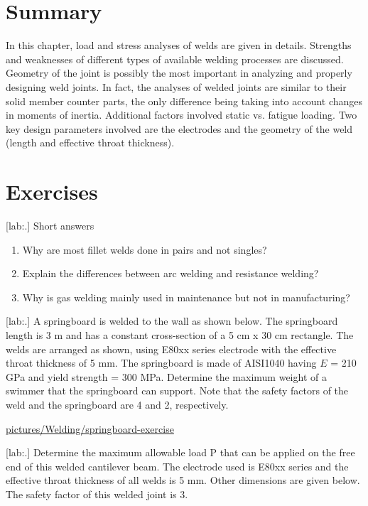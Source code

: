 \documentclass[a4paper,openany,12pt]{book}
\begin{document}
{{\section{Summary}
\label{summary-6}
In this chapter, load and stress analyses of welds are given in details.
Strengths and weaknesses of different types of available welding
processes are discussed. Geometry of the joint is possibly the most
important in analyzing and properly designing weld joints. In fact, the
analyses of welded joints are similar to their solid member counter
parts, the only difference being taking into account changes in moments
of inertia. Additional factors involved static vs. fatigue loading. Two
key design parameters involved are the electrodes and the geometry of
the weld (length and effective throat thickness).

\section{Exercises}
\label{exercises-6}
[lab:.] Short answers

\begin{enumerate}
\item Why are most fillet welds done in pairs and not singles?

\item Explain the differences between arc welding and resistance welding?

\item Why is gas welding mainly used in maintenance but not in
manufacturing?
\end{enumerate}

[lab:.] A springboard is welded to
the wall as shown below. The springboard length is 3 m and has a
constant cross-section of a 5 cm x 30 cm rectangle. The welds are
arranged as shown, using E80xx series electrode with the effective
throat thickness of 5 mm. The springboard is made of AISI1040 having \(E\)
= 210 GPa and yield strength = 300 MPa. Determine the maximum weight of
a swimmer that the springboard can support. Note that the safety factors
of the weld and the springboard are 4 and 2, respectively.


\url{pictures/Welding/springboard-exercise}

[lab:.] Determine the maximum
allowable load P that can be applied on the free end of this welded
cantilever beam. The electrode used is E80xx series and the effective
throat thickness of all welds is 5 mm. Other dimensions are given below.
The safety factor of this welded joint is 3.


}}
\end{document}
